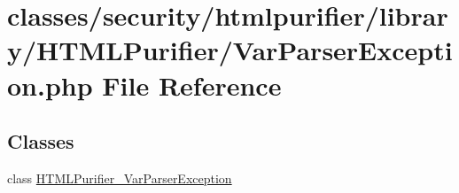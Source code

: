 \hypertarget{VarParserException_8php}{\section{classes/security/htmlpurifier/library/\+H\+T\+M\+L\+Purifier/\+Var\+Parser\+Exception.php File Reference}
\label{VarParserException_8php}
}
\subsection*{Classes}
\begin{DoxyCompactItemize}
\item 
class \hyperlink{classHTMLPurifier__VarParserException}{H\+T\+M\+L\+Purifier\+\_\+\+Var\+Parser\+Exception}
\end{DoxyCompactItemize}
